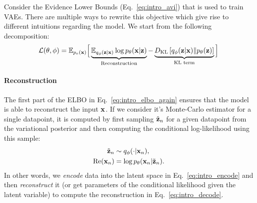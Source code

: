 Consider the Evidence Lower Bounds (Eq.~\ref{eq:intro_avi}) that is used to train VAEs. There are multiple ways to rewrite this objective which give rise to different intuitions regarding the model. We start from the following decomposition:
\begin{equation}\label{eq:intro_elbo_again}
\mathcal{L}(\theta, \phi) = \E_{p_e(\rvx)}\Big[ \underbrace{\E_{q_{\phi}(\rvz|\rvx)} \log p_{\theta}(\rvx| \rvz)}_{\text{Reconstruction}} - \underbrace{\KL{q_{\phi}(\rvz|\rvx)}{p_{\theta}(\rvz)}}_{\text{KL term}} \Big]%
\end{equation}

\paragraph{Reconstruction}
The first part of the ELBO in Eq.~\ref{eq:intro_elbo_again} ensures that the model is able to reconstruct the input ${\mathbf{x}}$. If we consider it's Monte-Carlo estimator for a single datapoint, it is computed by first sampling $\tilde{{\mathbf{z}}}_n$ for a given datapoint from the variational posterior
and then computing the conditional log-likelihood using this sample:
\begin{align}
    \tilde{\rvz}_n &\sim q_{\phi}(\cdot|\rvx_n), \label{eq:intro_encode}\\
    \text{Re}(\rvx_n) &= \log p_{\theta}(\rvx_n|\tilde{\rvz}_n).\label{eq:intro_decode}
\end{align}
In other words, we \textit{encode} data into the latent space in Eq.~\ref{eq:intro_encode} and then \textit{reconstruct} it (or get parameters of the conditional likelihood given the latent variable) to compute the reconstruction in Eq.~\ref{eq:intro_decode}.


